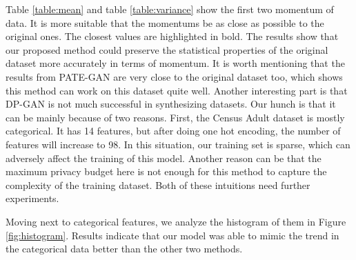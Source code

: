 \documentclass{article}
\begin{document}
Table \ref{table:mean} and table \ref{table:variance} show the first two momentum of data. It is more suitable that the momentums be as close as possible to the original ones. The closest values are highlighted in bold. The results show that our proposed method could preserve the statistical properties of the original dataset more accurately in terms of momentum. It is worth mentioning that the results from PATE-GAN are very close to the original dataset too, which shows this method can work on this dataset quite well. Another interesting part is that DP-GAN is not much successful in synthesizing datasets. Our hunch is that it can be mainly because of two reasons. First, the Census Adult dataset is mostly categorical. It has 14 features, but after doing one hot encoding, the number of features will increase to 98. In this situation, our training set is sparse, which can adversely affect the training of this model. Another reason can be that the maximum privacy budget here is not enough for this method to capture the complexity of the training dataset. Both of these intuitions need further experiments.

Moving next to categorical features, we analyze the histogram of them in Figure \ref{fig:histogram}. Results indicate that our model was able to mimic the trend in the categorical data better than the other two methods.
\end{document}
